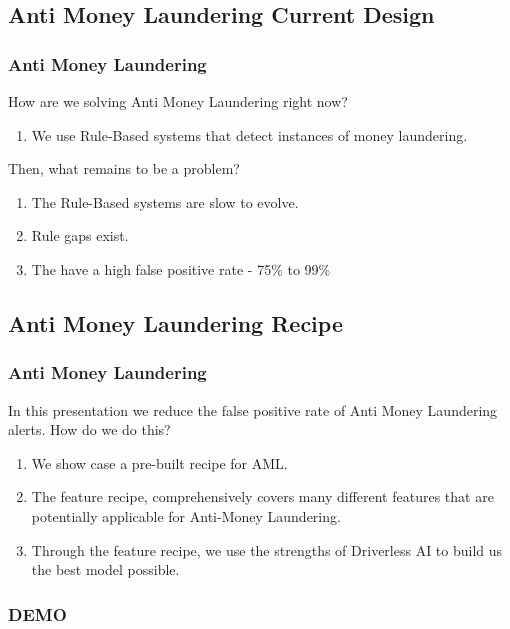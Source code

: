 \documentclass[11pt,
               aspectratio=169,
               hyperref={colorlinks}
               ]{beamer}
\begin{document}
	\subsection{Anti Money Laundering Current Design}
	\begin{frame}
		\frametitle{Anti Money Laundering}
		How are we solving Anti Money Laundering right now? \\
		\begin{enumerate}
			\item We use Rule-Based systems that detect instances of money laundering.
		\end{enumerate}

		Then, what remains to be a problem?\\
		\begin{enumerate}
			\item The Rule-Based systems are slow to evolve. 
			\item Rule gaps exist. 
			\item The have a high false positive rate - 75\% to 99\%
		\end{enumerate}
	\end{frame}

		\subsection{Anti Money Laundering Recipe}
	\begin{frame}
		\frametitle{Anti Money Laundering}
		In this presentation we reduce the false positive rate of Anti Money Laundering alerts. How do we do this? \\

		\begin{enumerate}
			\item We show case a pre-built recipe for AML. 
			\item The feature recipe, comprehensively covers many different features that are potentially applicable for Anti-Money Laundering. 
			\item Through the feature recipe, we use the strengths of Driverless AI to build us the best model possible. 
		\end{enumerate}
	\end{frame}

	\begin{frame}
		\frametitle{DEMO}
	\end{frame}
\end{document}
